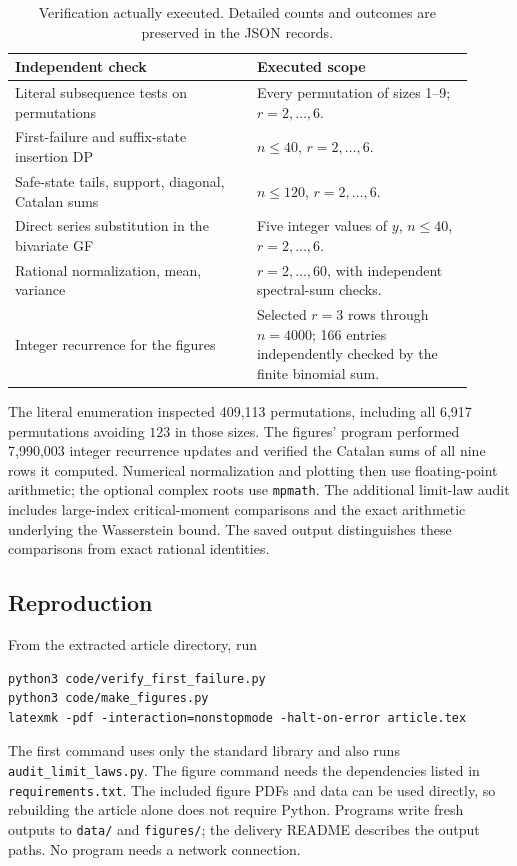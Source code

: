 \documentclass[11pt]{article}
\numberwithin{equation}{section}
\theoremstyle{definition}
\begin{document}
\begin{table}[ht]
\centering\small
\begin{tabular}{@{}p{0.48\linewidth}p{0.43\linewidth}@{}}
\toprule
Independent check & Executed scope \\
\midrule
Literal subsequence tests on permutations & Every permutation of sizes 1--9; \(r=2,\ldots,6\). \\
First-failure and suffix-state insertion DP & \(n\le40\), \(r=2,\ldots,6\). \\
Safe-state tails, support, diagonal, Catalan sums & \(n\le120\), \(r=2,\ldots,6\). \\
Direct series substitution in the bivariate GF & Five integer values of \(y\), \(n\le40\), \(r=2,\ldots,6\). \\
Rational normalization, mean, variance & \(r=2,\ldots,60\), with independent spectral-sum checks. \\
Integer recurrence for the figures & Selected \(r=3\) rows through \(n=4000\); 166 entries independently checked by the finite binomial sum. \\
\bottomrule
\end{tabular}
\caption{Verification actually executed. Detailed counts and outcomes
are preserved in the JSON records.}
\label{fpf:lp:tab:verification}
\end{table}

The literal enumeration inspected 409,113 permutations, including all
6,917 permutations avoiding \(123\) in those sizes. The figures' program
performed 7,990,003 integer recurrence updates and verified the Catalan
sums of all nine rows it computed. Numerical normalization and plotting
then use floating-point arithmetic; the optional complex roots use
\texttt{mpmath}. The additional limit-law audit includes large-index
critical-moment comparisons and the exact arithmetic underlying the
Wasserstein bound. The saved output distinguishes these comparisons
from exact rational identities.

\subsection{Reproduction}

From the extracted article directory, run
\begin{verbatim}
python3 code/verify_first_failure.py
python3 code/make_figures.py
latexmk -pdf -interaction=nonstopmode -halt-on-error article.tex
\end{verbatim}
The first command uses only the standard library and also runs
\texttt{audit\_limit\_laws.py}. The figure command needs the dependencies
listed in \texttt{requirements.txt}. The included figure PDFs and data
can be used directly, so rebuilding the article alone does not require
Python. Programs write fresh outputs to \texttt{data/} and
\texttt{figures/}; the delivery README describes the output paths.
No program needs a network connection.
\end{document}
